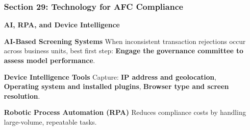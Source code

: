 \documentclass[12pt,aspectratio=169]{beamer}
\renewcommand{\scriptsize}{\fontsize{5}{6}\selectfont}
\begin{document}
	\begin{frame}
		\frametitle{\fontsize{13}{15}\selectfont \textbf{Section 29: Technology for AFC Compliance}}
		\vspace{0.3cm}
		\begin{center}
			{\fontsize{12}{14}\selectfont \textbf{AI, RPA, and Device Intelligence}}
		\end{center}
		\vspace{0.1cm}
		\begin{block}{\textbf{AI-Based Screening Systems}}
			\scriptsize
			When inconsistent transaction rejections occur across business units, best first step: \textbf{Engage the governance committee to assess model performance}.
		\end{block}
		\begin{block}{\textbf{Device Intelligence Tools}}
			\scriptsize
			Capture: \textbf{IP address and geolocation}, \textbf{Operating system and installed plugins}, \textbf{Browser type and screen resolution}.
		\end{block}
		\begin{block}{\textbf{Robotic Process Automation (RPA)}}
			\scriptsize
			Reduces compliance costs by handling large-volume, repeatable tasks.
		\end{block}
	\end{frame}
	
\end{document}
